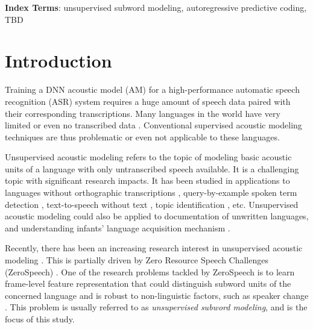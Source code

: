 \documentclass[a4paper]{article}
\begin{document}
\noindent\textbf{Index Terms}: unsupervised subword modeling, autoregressive predictive coding, {\color{cyan}TBD}

\section{Introduction}

Training a DNN acoustic model (AM) for a high-performance automatic speech recognition (ASR) system requires a huge amount of speech data paired with their corresponding transcriptions. 
Many languages in the world have very limited or even no transcribed data \cite{dunbar2017zero}. 
Conventional supervised acoustic modeling techniques are thus problematic or even not applicable to these languages.

Unsupervised acoustic modeling refers to the topic of modeling basic acoustic units of a language with only untranscribed speech available. It is a challenging topic with significant research impacts. It has been studied in applications to languages without orthographic transcriptions \cite{I3EWang}, query-by-example spoken term detection \cite{Chen+2016}, text-to-speech without text \cite{Dunbar2019}, topic identification \cite{SiuGishChanEtAl2014}, etc. Unsupervised acoustic modeling could also be applied to documentation of unwritten languages, and understanding infants' language acquisition mechanism \cite{versteegh2015zero}. 

Recently, there has been an increasing  research interest in unsupervised acoustic modeling \cite{chen2015parallel,heck2017feature,Kamper2017segmental,Tjandra2019,Feng2019combining,Ondel2019Bayesian}. This is partially driven by Zero Resource Speech Challenges (ZeroSpeech) \cite{versteegh2015zero,dunbar2017zero,Dunbar2019}.
One of the research problems tackled by ZeroSpeech is to learn frame-level feature representation that could distinguish subword units of the concerned language and is robust to non-linguistic factors, such as speaker change \cite{versteegh2015zero,dunbar2017zero}. This problem is usually referred to as \textit{unsupervised subword modeling}, and is the focus of this study. 
\end{document}
